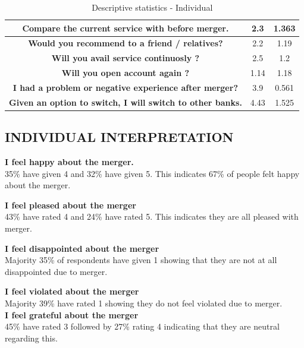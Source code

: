 \documentclass[a4paper, 12pt]{extarticle}
\begin{document}
{\begin{table}[H]
\begin{tabular}{|c|c|c|}
\hline
\textbf{ Compare the current service with before merger.} & 2.3 & 1.363 \\
\hline
\textbf{ Would you recommend to a friend / relatives?} & 2.2 & 1.19 \\
\hline
\textbf{ Will you avail service continuosly ?} & 2.5 & 1.2 \\
\hline
\textbf{ Will you open account again ?} & 1.14 & 1.18 \\
\hline
\textbf{ I had a problem or negative experience after merger?} & 3.9 & 0.561 \\
\hline
\textbf{ Given an option to switch, I will switch to other banks.} & 4.43 & 1.525 \\
\hline
\end{tabular}
\caption{Descriptive statistics - Individual}
\end{table}

\subsection{INDIVIDUAL INTERPRETATION}
 
\par \textbf{ I feel happy about the merger.} \\
35\% have given 4 and 32\% have given 5. This indicates 67\% of people felt happy about the merger.

\par \textbf{ I feel pleased about the merger} \\
43\% have rated 4 and 24\% have rated 5. This indicates they are all pleased with merger.\\

\par \textbf{ I feel disappointed about the merger } \\
Majority 35\% of respondents have given 1 showing that they are not at all disappointed due to merger.\\

\par \textbf{ I feel violated about the merger} \\
Majority 39\% have rated 1 showing they do not feel violated due to merger.\\

\textbf{ I feel grateful about the merger}  \\
 45\% have rated 3 followed by 27\% rating 4 indicating that they are neutral regarding this.\\

}
\end{document}
